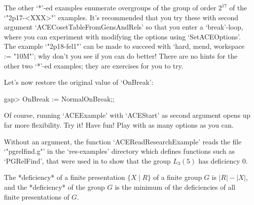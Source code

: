 The other `*'-ed examples enumerate overgroups of the group  of  order
$2^{17}$ of the `"2p17-<XXX>"' examples. It's recommended that you try
these with second argument `ACECosetTableFromGensAndRels' so that  you
enter a `break'-loop, where you  can  experiment  with  modifying  the
options using `SetACEOptions'. The example `"2p18-fel1"' can  be  made
to succeed with `hard, mend, workspace := "10M"'; why don't you see if
you can do better! There  are  no  hints  for  the  other  two  `*'-ed
examples; they are exercises for you to try.

Let's now restore the original value of `OnBreak':

\beginexample
gap> OnBreak := NormalOnBreak;;

\endexample

Of course, running `ACEExample' with  `ACEStart'  as  second  argument
opens up far more flexibility. Try it! Have fun!  Play  with  as  many
options as you can. 


Without an argument, the function `ACEReadResearchExample'  reads  the
file `"pgrelfind.g"' in the  `res-examples'  directory  which  defines
{\GAP} functions such as `PGRelFind', that were used in  \cite{CHHR01}
to show that the group $L_3(5)$ has deficiency 0.
%

The *deficiency* of a finite presentation $\{X \mid R\}$ of  a  finite
group $G$ is $|R| - |X|$, and the *deficiency* of the group $G$ is the
minimum of the deficiencies of all finite presentations of $G$.

